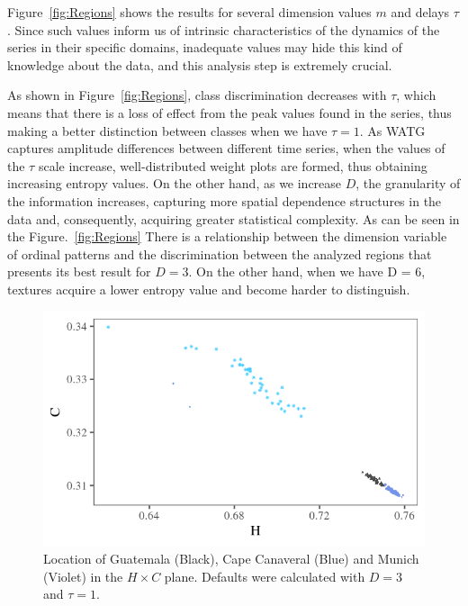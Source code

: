 \documentclass{isprs}
\begin{document}
Figure~\ref{fig:Regions} shows the results for several dimension values $m$ and delays $\tau$.
Since such values inform us of intrinsic characteristics of the dynamics of the series in their specific domains, inadequate values may hide this kind of knowledge about the data, and this analysis step is extremely crucial.

As shown in Figure~\ref{fig:Regions}, class discrimination decreases with $\tau$, which means that there is a loss of effect from the peak values found in the series, thus making a better distinction between classes when we have $\tau = 1$.
As WATG captures amplitude differences between different time series, when the values of the $\tau$ scale increase, well-distributed weight plots are formed, thus obtaining increasing entropy values.
On the other hand, as we increase $D$, the granularity of the information increases, capturing more spatial dependence structures in the data and, consequently, acquiring greater statistical complexity.
As can be seen in the Figure.~\ref{fig:Regions} There is a relationship between the dimension variable of ordinal patterns and the discrimination between the analyzed regions that presents its best result for $D = 3$.
On the other hand, when we have D = 6, textures acquire a lower entropy value and become harder to distinguish.

\begin{figure}[hbt]
	\centering
	\includegraphics[width=0.9\columnwidth]{Figures/transitionGraphD3t1.png}
	\caption{Location of Guatemala (Black), Cape Canaveral (Blue) and Munich (Violet) in the $H \times C$ plane. Defaults were calculated with $D = 3$ and $\tau = 1$.}
	\label{fig:D3T1}
\end{figure}
\end{document}
